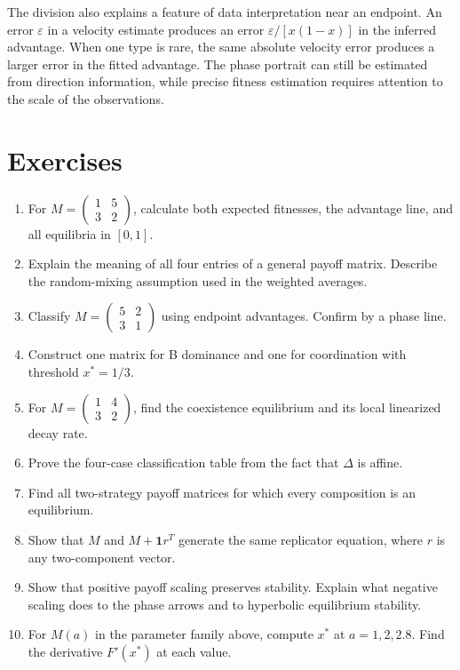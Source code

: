 \documentclass[11pt,oneside,openany]{book}
\theoremstyle{definition}
\theoremstyle{remark}
\newenvironment{exercises}{\begin{enumerate}[label=\thechapter.\arabic*,ref=\thechapter.\arabic*,leftmargin=2.8em,itemsep=6pt]}{\end{enumerate}}
\newcommand{\ones}{\mathbf{1}}
\numberwithin{equation}{chapter}
\begin{document}
The division also explains a feature of data interpretation near an endpoint. An error $\varepsilon$ in a velocity estimate produces an error $\varepsilon/[x(1-x)]$ in the inferred advantage. When one type is rare, the same absolute velocity error produces a larger error in the fitted advantage. The phase portrait can still be estimated from direction information, while precise fitness estimation requires attention to the scale of the observations.

\FloatBarrier
\section{Exercises}
\begin{exercises}
\item For $M=\left(\begin{smallmatrix}1&5\\3&2\end{smallmatrix}\right)$, calculate both expected fitnesses, the advantage line, and all equilibria in $[0,1]$.
\item Explain the meaning of all four entries of a general payoff matrix. Describe the random-mixing assumption used in the weighted averages.
\item Classify $M=\left(\begin{smallmatrix}5&2\\3&1\end{smallmatrix}\right)$ using endpoint advantages. Confirm by a phase line.
\item Construct one matrix for B dominance and one for coordination with threshold $x^*=1/3$.
\item For $M=\left(\begin{smallmatrix}1&4\\3&2\end{smallmatrix}\right)$, find the coexistence equilibrium and its local linearized decay rate.
\item Prove the four-case classification table from the fact that $\Delta$ is affine.
\item Find all two-strategy payoff matrices for which every composition is an equilibrium.
\item Show that $M$ and $M+\ones r^T$ generate the same replicator equation, where $r$ is any two-component vector.
\item Show that positive payoff scaling preserves stability. Explain what negative scaling does to the phase arrows and to hyperbolic equilibrium stability.
\item For $M(a)$ in the parameter family above, compute $x^*$ at $a=1,2,2.8$. Find the derivative $F'(x^*)$ at each value.

\end{exercises}
\end{document}
